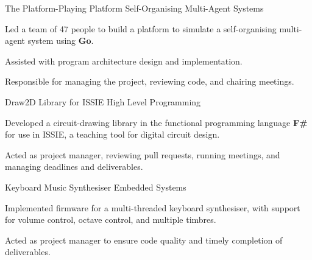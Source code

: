 

\begin{cvprojects}


  \cvproject
  {The Platform-Playing Platform} %
  {Self-Organising Multi-Agent Systems} %
  { %
      \begin{cvitems}
          \item Led a team of 47 people to build a platform to simulate a self-organising multi-agent system using \textbf{Go}.
          \item Assisted with program architecture design and implementation.
          \item Responsible for managing the project, reviewing code, and chairing meetings.
      \end{cvitems}
  }

  \cvproject
  {Draw2D Library for ISSIE} %
  {High Level Programming} %
  { %
      \begin{cvitems}
          \item {Developed a circuit-drawing library in the functional programming language \textbf{F\#} for use in ISSIE, a teaching tool for digital circuit design.}%
          \item Acted as project manager, reviewing pull requests, running meetings, and managing deadlines and deliverables.
      \end{cvitems}
  }

  \cvproject
  {Keyboard Music Synthesiser} %
  {Embedded Systems} %
  { %
      \begin{cvitems}
          \item {Implemented firmware for a multi-threaded keyboard synthesiser, with support for volume control, octave control, and multiple timbres.}
          \item Acted as project manager to ensure code quality and timely completion of deliverables.
      \end{cvitems}
  }


\end{cvprojects}
